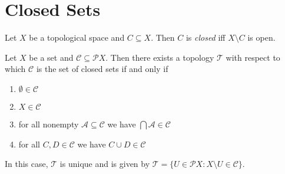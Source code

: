 \section{Closed Sets}

\begin{df}
  Let $X$ be a topological space and $C \subseteq X$. Then $C$ is \emph{closed} iff $X \setminus C$ is open.
\end{df}

\begin{prop}
  \label{prop:closed}
  Let $X$ be a set and $\mathcal{C} \subseteq \mathcal{P} X$. Then there exists a topology $\mathcal{T}$ with respect to which $\mathcal{C}$ is the set of closed sets if and only if
  \begin{enumerate}
    \item
    $\emptyset \in \mathcal{C}$
    \item
    $X \in \mathcal{C}$
    \item
    for all nonempty $\mathcal{A} \subseteq \mathcal{C}$ we have $\bigcap \mathcal{A} \in \mathcal{C}$
    \item
    for all $C, D \in \mathcal{C}$ we have $C \cup D \in \mathcal{C}$
  \end{enumerate}
  In this case, $\mathcal{T}$ is unique and is given by $\mathcal{T} = \{ U \in \mathcal{P} X : X \setminus U \in \mathcal{C} \}$.
\end{prop}

